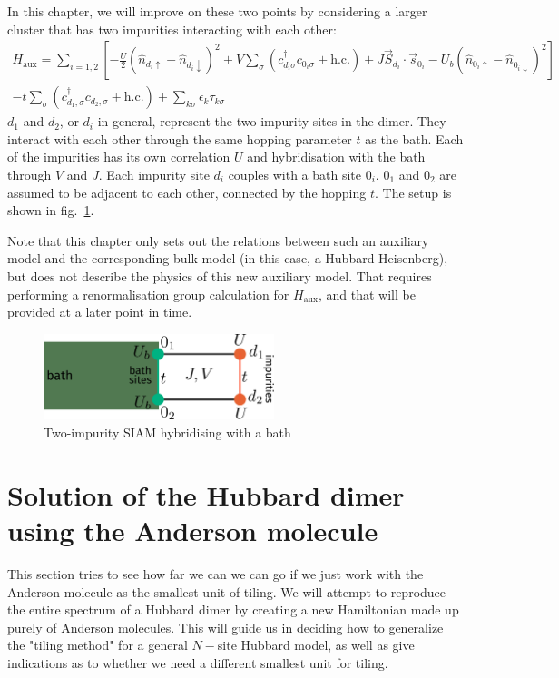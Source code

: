 \documentclass[10pt]{report}
\numberwithin{equation}{section}
\begin{document}
In this chapter, we will improve on these two points by considering a larger cluster that has two impurities interacting with each other:
\begin{equation}\begin{aligned}
	\label{dimer_ham}
	H_\text{aux} = \sum_{i=1,2} \left[- \frac{U}{2}\left(\hat n_{d_i \uparrow} - \hat n_{d_i \downarrow}\right)^2 + V\sum_{\sigma}\left(c^\dagger_{d_i\sigma}c_{0_i\sigma} + \text{h.c.}\right) + J \vec{S}_{d_i}\cdot\vec{s}_{0_i} - U_b\left(\hat n_{0_i \uparrow} - \hat n_{0_i \downarrow}\right)^2\right]\\
	 -t \sum_\sigma \left(c^\dagger_{d_1,\sigma}c_{d_2,\sigma} + \text{h.c.}\right) + \sum_{k\sigma}\epsilon_k \tau_{k\sigma}
\end{aligned}\end{equation}
\(d_1\) and \(d_2\), or \(d_i\) in general, represent the two impurity sites in the dimer. They interact with each other through the same hopping parameter \(t\) as the bath. Each of the impurities has its own correlation \(U\) and hybridisation with the bath through \(V\) and \(J\). Each impurity site \(d_i\) couples with a bath site \(0_i\). \(0_1\) and \(0_2\) are assumed to be adjacent to each other, connected by the hopping \(t\). The setup is shown in fig.~\ref{two-imp-cluster}.

Note that this chapter only sets out the relations between such an auxiliary model and the corresponding bulk model (in this case, a Hubbard-Heisenberg), but does not describe the physics of this new auxiliary model. That requires performing a renormalisation group calculation for \(H_\text{aux}\), and that will be provided at a later point in time.

\begin{figure}[htpb]
	\centering
	\includegraphics[width=0.6\textwidth]{../figures/two-site-cluster.pdf}
	\caption{Two-impurity SIAM hybridising with a bath}
	\label{two-imp-cluster}
\end{figure}

\section{Solution of the Hubbard dimer using the Anderson molecule}
This section tries to see how far we can we can go if we just work with the Anderson molecule as the smallest unit of tiling. We will attempt to reproduce the entire spectrum of a Hubbard dimer by creating a new Hamiltonian made up purely of Anderson molecules. This will guide us in deciding how to generalize the "tiling method" for a general $N-$site Hubbard model, as well as give indications as to whether we need a different smallest unit for tiling.
\end{document}
